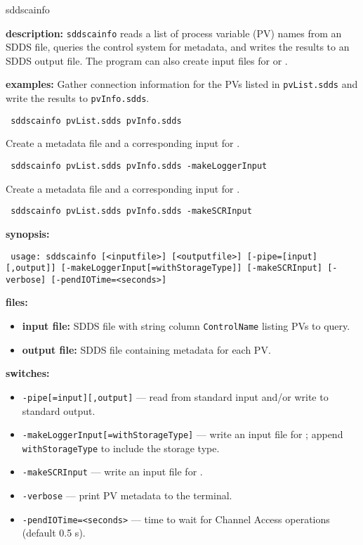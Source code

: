 %
%
\begin{sddsprog}{sddscainfo}
\item \textbf{description:}
  \verb+sddscainfo+ reads a list of process variable (PV) names from an SDDS file,
  queries the control system for metadata, and writes the results to an SDDS output file.
  The program can also create input files for  or .

\item \textbf{examples:}
  Gather connection information for the PVs listed in \verb+pvList.sdds+ and write the results to \verb+pvInfo.sdds+.
  \begin{flushleft}{\tt
sddscainfo pvList.sdds pvInfo.sdds
  }\end{flushleft}
  Create a metadata file and a corresponding input for .
  \begin{flushleft}{\tt
sddscainfo pvList.sdds pvInfo.sdds -makeLoggerInput
  }\end{flushleft}
  Create a metadata file and a corresponding input for .
  \begin{flushleft}{\tt
sddscainfo pvList.sdds pvInfo.sdds -makeSCRInput
  }\end{flushleft}

\item \textbf{synopsis:}
  \begin{flushleft}{\tt
usage: sddscainfo [<inputfile>] [<outputfile>]\
[-pipe=[input][,output]]\
[-makeLoggerInput[=withStorageType]]\
[-makeSCRInput]\
[-verbose]\
[-pendIOTime=<seconds>]
  }\end{flushleft}

\item \textbf{files:}
\begin{itemize}
  \item \textbf{input file:} SDDS file with string column \verb|ControlName| listing PVs to query.
  \item \textbf{output file:} SDDS file containing metadata for each PV.
\end{itemize}

\item \textbf{switches:}
\begin{itemize}
  \item {\tt -pipe[=input][,output]} --- read from standard input and/or write to standard output.
  \item {\tt -makeLoggerInput[=withStorageType]} --- write an input file for ; append \verb|withStorageType| to include the storage type.
  \item {\tt -makeSCRInput} --- write an input file for .
  \item {\tt -verbose} --- print PV metadata to the terminal.
  \item {\tt -pendIOTime=<seconds>} --- time to wait for Channel Access operations (default 0.5 s).
\end{itemize}


\end{sddsprog}
